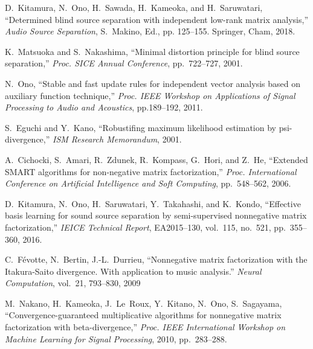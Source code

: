 \documentclass[honka]{nitkagawathesis}%
\begin{document}
\begin{thebibliography}{99}
  D.~Kitamura, N.~Ono, H.~Sawada, H.~Kameoka, and H.~Saruwatari, ``Determined blind source separation with independent low-rank matrix analysis,'' 
  {\em Audio Source Separation}, S.~Makino, Ed., pp. 125--155. Springer, Cham, 2018.

  K.~Matsuoka and S.~Nakashima,
  ``Minimal distortion principle for blind source separation,''
  {\em Proc. SICE Annual Conference}, pp.~722--727, 2001.
  
  N.~Ono,
  ``Stable and fast update rules for independent vector analysis based on auxiliary function technique,''
  {\em Proc. IEEE Workshop on Applications of Signal Processing to Audio and Acoustics}, pp.189--192, 2011.
  
  
  S.~Eguchi and Y.~Kano, 
  ``Robustifing maximum likelihood estimation by psi- divergence,'' 
  {\em ISM Research Memorandum}, 2001.
  
  A.~Cichocki, S.~Amari, R.~Zdunek, R.~Kompass, G.~Hori, and Z.~He, 
  ``Extended SMART algorithms for non-negative matrix factorization,'' 
  {\em Proc. International Conference on Artificial Intelligence and Soft Computing}, pp.~548--562, 2006.
  
  D.~Kitamura, N.~Ono, H.~Saruwatari, Y.~Takahashi, and K.~Kondo, 
  ``Effective basis learning for sound source separation by semi-supervised nonnegative matrix factorization,'' 
  {\em IEICE Technical Report}, EA2015--130, vol.~115, no.~521, pp.~355--360, 2016.

  C.~Févotte, N.~Bertin, J.-L.~Durrieu, 
  ``Nonnegative matrix factorization with the Itakura-Saito divergence. With application to music analysis.'' 
  {\em Neural Computation}, vol.~21, 793--830, 2009
  
  M.~Nakano, H.~Kameoka, J.~Le~Roux, Y.~Kitano, N.~Ono, S.~Sagayama, ``Convergence-guaranteed multiplicative algorithms for nonnegative matrix factorization with beta-divergence,''
  {\em Proc. IEEE International Workshop on Machine Learning for Signal Processing}, 2010, pp.~283--288.
  

\end{thebibliography}
\end{document}
